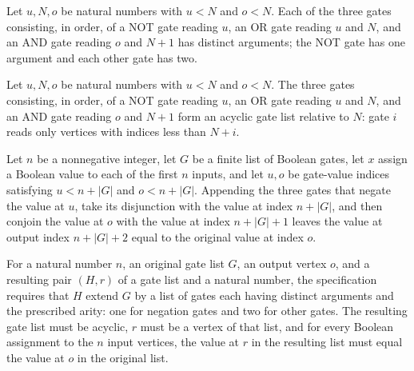 \begin{theorem}
\label{BoolCircuit.sealTriple_strict}
\leanok
{}
Let $u,N,o$ be natural numbers with $u<N$ and $o<N$. Each of the three gates consisting,
in order, of a NOT gate reading $u$, an OR gate reading $u$ and $N$, and an AND gate
reading $o$ and $N+1$ has distinct arguments; the NOT gate has one argument and each
other gate has two.
\end{theorem}

\begin{theorem}
\label{BoolCircuit.sealTriple_acyclic}
\leanok
{}
Let $u,N,o$ be natural numbers with $u<N$ and $o<N$. The three gates consisting, in
order, of a NOT gate reading $u$, an OR gate reading $u$ and $N$, and an AND gate
reading $o$ and $N+1$ form an acyclic gate list relative to $N$: gate $i$ reads only
vertices with indices less than $N+i$.
\end{theorem}

\begin{theorem}
\label{BoolCircuit.vertexValue_sealStep}
\leanok
{}
Let $n$ be a nonnegative integer, let $G$ be a finite list of Boolean gates, let $x$
assign a Boolean value to each of the first $n$ inputs, and let $u,o$ be gate-value
indices satisfying $u<n+|G|$ and $o<n+|G|$. Appending the three gates that negate the
value at $u$, take its disjunction with the value at index $n+|G|$, and then conjoin the
value at $o$ with the value at index $n+|G|+1$ leaves the value at output index
$n+|G|+2$ equal to the original value at index $o$.
\end{theorem}

\begin{definition}
\label{BoolCircuit.SealSpec}
\leanok
{}
For a natural number $n$, an original gate list $G$, an output vertex $o$, and a
resulting pair $(H,r)$ of a gate list and a natural number, the specification requires
that $H$ extend $G$ by a list of gates each having distinct arguments and the prescribed
arity: one for negation gates and two for other gates. The resulting gate list must be
acyclic, $r$ must be a vertex of that list, and for every Boolean assignment to the $n$
input vertices, the value at $r$ in the resulting list must equal the value at $o$ in
the original list.
\end{definition}

